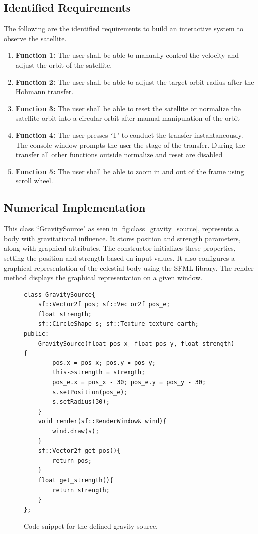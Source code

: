 \documentclass[12pt, letter]{article}
\begin{document}
\subsection{Identified Requirements}
The following are the identified requirements to build an interactive system to observe the satellite.
\begin{enumerate}
    \item \textbf{Function 1:} The user shall be able to manually control the velocity and adjust the orbit of the satellite.
    \item \textbf{Function 2:} The user shall be able to adjust the target orbit radius after the Hohmann transfer.
    \item \textbf{Function 3:} The user shall be able to reset the satellite or normalize the satellite orbit into a circular orbit after manual manipulation of the orbit
    \item \textbf{Function 4:} The user presses `T' to conduct the transfer instantaneously. The console window prompts the user the stage of the transfer. During the transfer all other functions outside normalize and reset are disabled 
    \item \textbf{Function 5:} The user shall be able to zoom in and out of the frame using scroll wheel.
\end{enumerate}

\subsection{Numerical Implementation}
This class ``GravitySource" as seen in \autoref{fig:class_gravity_source}, represents a body with gravitational influence. It stores position and strength parameters, along with graphical attributes. The constructor initializes these properties, setting the position and strength based on input values. It also configures a graphical representation of the celestial body using the SFML library. The render method displays the graphical representation on a given window.

\begin{figure}[H]
    \begin{verbatim}
class GravitySource{
	sf::Vector2f pos; sf::Vector2f pos_e;
	float strength;
	sf::CircleShape s; sf::Texture texture_earth;
public:
	GravitySource(float pos_x, float pos_y, float strength){
		pos.x = pos_x; pos.y = pos_y;
		this->strength = strength;
		pos_e.x = pos_x - 30; pos_e.y = pos_y - 30;
		s.setPosition(pos_e);
		s.setRadius(30);
	}
	void render(sf::RenderWindow& wind){
		wind.draw(s);
	}
	sf::Vector2f get_pos(){
		return pos;
	}
	float get_strength(){
		return strength;
	}
};
    \end{verbatim}
    \caption{Code snippet for the defined gravity source.}
    \label{fig:class_gravity_source}
\end{figure}
\end{document}
